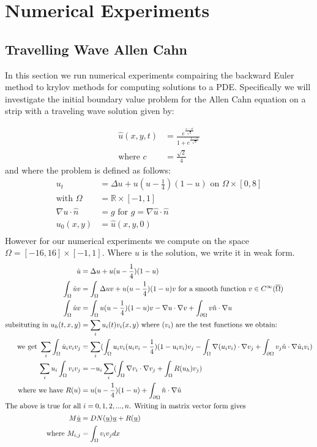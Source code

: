 \section{Numerical Experiments}

\subsection{Travelling Wave Allen Cahn}
In this section we run numerical experiments compairing the backward Euler method to krylov methods for computing solutions to a PDE.
Specifically we will investigate the initial boundary value problem for the Allen Cahn equation on a strip with a traveling wave solution\cite{YukitakaFukao2004} given by:

\begin{align}
    \hat u(x,y,t)&=\frac{e^{\frac{x-ct}{\sqrt2}}}{1+e^{\frac{x-ct}{\sqrt2}}} \label{TravelingWaveSol}\\
    \text{where } c &= \frac{\sqrt{2}}{4}
\end{align}
and where the problem is defined as follows:
\begin{align*}
    u_t&=\Delta u+u(u-\frac14)(1-u) \text{ on $\Omega \times [0, 8]$}\\
    \text{with } \Omega &= \mathbb{R}\times[-1,1]\\
    \nabla u \cdot \hat n &= g \text{ for $g = \nabla \hat u \cdot \hat n$}\\
    u_0(x, y) &= \hat u(x,y, 0)\\
\end{align*}
However for our numerical experiments we compute on the space $\Omega=[-16,16]\times[-1,1]$.
Where $u$ is the solution, we write it in weak form.
\begin{align*}
    \dot u&=\Delta u+u(u-\frac14)(1-u)\\
    \int_{\Omega} \dot u v &=\int_{\Omega} \Delta uv+u(u-\frac14)(1-u)v \text{ for a smooth function $v \in C^{\infty}(\overline{\Omega})$}\\
    \int_{\Omega} \dot u v &=\int_{\Omega} u(u-\frac14)(1-u)v - \nabla u \cdot \nabla v + \int_{\partial\Omega}  v\hat n \cdot \nabla u\\
    \text{subsituting in } u_h(t,x,y) &= \sum_i u_i(t) v_i(x,y) \text{ where $(v_i)$ are the test functions we obtain:}\\
    \text{we get } \sum_i\int_{\Omega} \dot u_i v_i v_j &=\sum_i(\int_{\Omega} u_iv_i(u_iv_i-\frac14)(1-u_iv_i)v_j - \int_{\Omega}\nabla (u_iv_i) \cdot \nabla v_j + \int_{\partial\Omega}  v_j\hat n \cdot \nabla \hat u_iv_i)\\
    \sum_iu_i\int_{\Omega}v_iv_j &= -u_i\sum_i(\int_{\Omega}\nabla v_i \cdot \nabla v_j + \int_{\Omega}R(u_h)v_j)\\
    \text{where we have } R(u)&=u(u-\frac14)(1-u) + \int_{\partial\Omega}  \hat n \cdot \nabla \hat  u\\
    \intertext{The above is true for all $i=0,1,2,...,n$. Writing in matrix vector form gives}
    M \underline{\dot u} &= DN(\underline{u})\underline{u} + R(\underline{u})\\
    \text{where } M_{i,j} &= \int_{\Omega}v_iv_jdx
\end{align*}
